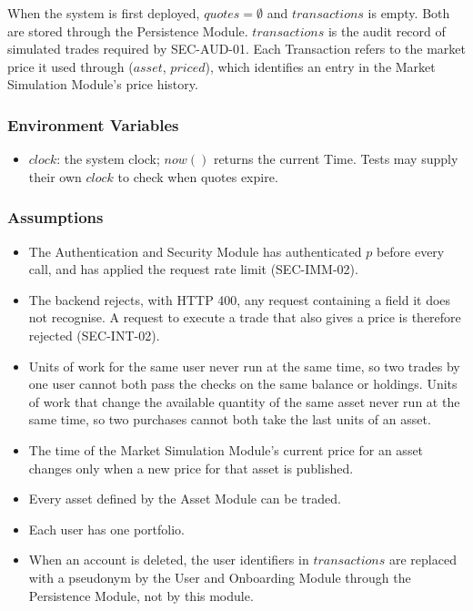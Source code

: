 \documentclass[12pt, titlepage]{article}
\begin{document}
\noindent When the system is first deployed, $\mathit{quotes} = \emptyset$
and $\mathit{transactions}$ is empty. Both are stored through the
Persistence Module. $\mathit{transactions}$ is the audit record of simulated
trades required by SEC-AUD-01. Each Transaction refers to the market price
it used through ($\mathit{asset}$, $\mathit{priced}$), which identifies an
entry in the Market Simulation Module's price history.

\subsubsection{Environment Variables}

\begin{itemize}
\item $\mathit{clock}$: the system clock; $\mathit{now}()$ returns the
  current Time. Tests may supply their own $\mathit{clock}$ to check when
  quotes expire.
\end{itemize}

\subsubsection{Assumptions}

\begin{itemize}
\item The Authentication and Security Module has authenticated $p$ before
  every call, and has applied the request rate limit (SEC-IMM-02).
\item The backend rejects, with HTTP 400, any request containing a field it
  does not recognise. A request to execute a trade that also gives a price is
  therefore rejected (SEC-INT-02).
\item Units of work for the same user never run at the same time, so two
  trades by one user cannot both pass the checks on the same balance or
  holdings. Units of work that change the available quantity of the same
  asset never run at the same time, so two purchases cannot both take the
  last units of an asset.
\item The time of the Market Simulation Module's current price for an asset
  changes only when a new price for that asset is published.
\item Every asset defined by the Asset Module can be traded.
\item Each user has one portfolio.
\item When an account is deleted, the user identifiers in
  $\mathit{transactions}$ are replaced with a pseudonym by the User and
  Onboarding Module through the Persistence Module, not by this module.
\end{itemize}
\end{document}
